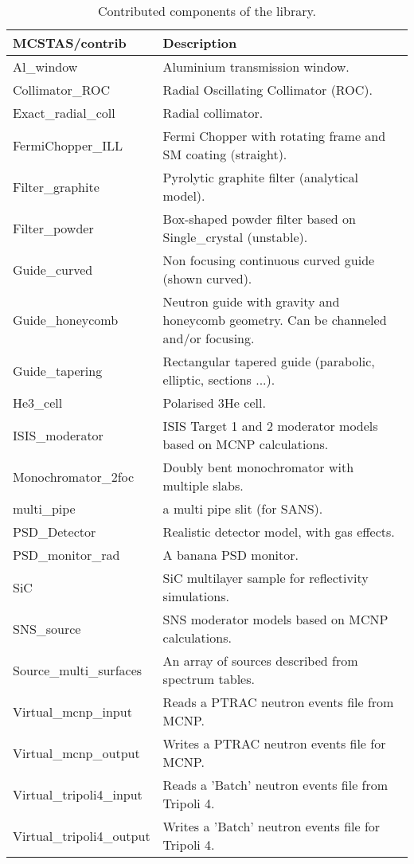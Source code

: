 \begin{table}
  \begin{center}
    {\let\my=\\
    \begin{tabular}{|p{}|p{}|}
      \hline
       \textbf{MCSTAS/contrib} & Description \\
       \hline
 Al\_window     &         Aluminium transmission window. \\
 Collimator\_ROC   &      Radial Oscillating Collimator (ROC). \\
 Exact\_radial\_coll &      Radial collimator. \\
 FermiChopper\_ILL &       Fermi Chopper with rotating frame and SM coating (straight). \\
 Filter\_graphite  &      Pyrolytic graphite filter (analytical model). \\
 Filter\_powder   &       Box-shaped powder
                        filter based on Single\_crystal (unstable). \\
 Guide\_curved     &     Non focusing continuous curved guide (shown curved). \\
 Guide\_honeycomb & Neutron guide with gravity and honeycomb geometry. Can be
                        channeled and/or focusing. \\
 Guide\_tapering  &     Rectangular tapered guide (parabolic, elliptic, sections ...). \\
 He3\_cell    &           Polarised 3He cell. \\
 ISIS\_moderator    &     ISIS Target 1 and 2 moderator models based on MCNP calculations. \\
 Monochromator\_2foc   &  Doubly bent monochromator with multiple slabs. \\
 multi\_pipe       & a multi pipe slit (for SANS). \\
 PSD\_Detector  & Realistic detector model, with gas effects. \\
 PSD\_monitor\_rad & A banana PSD monitor. \\
 SiC           &         SiC multilayer sample for reflectivity simulations. \\
 SNS\_source    & SNS moderator models based on MCNP calculations. \\
 Source\_multi\_surfaces & An array of sources described from spectrum tables. \\
 Virtual\_mcnp\_input & Reads a PTRAC neutron events file from MCNP. \\
 Virtual\_mcnp\_output& Writes a PTRAC neutron events file for MCNP. \\
 Virtual\_tripoli4\_input & Reads a 'Batch' neutron events file from Tripoli 4. \\
 Virtual\_tripoli4\_output& Writes a 'Batch' neutron events file for Tripoli 4. \\
      \hline
    \end{tabular}
    \caption{Contributed components of the \MCS library.}
    \label{t:comp-contrib}
    }
  \end{center}
\end{table}

